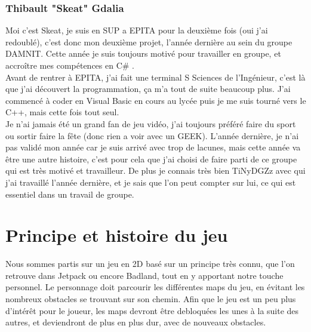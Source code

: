 \documentclass [11pt]{report}
\begin{document}
	
		
		
		\subsection {Thibault "Skeat" Gdalia}

			Moi c'est Skeat, je suis en SUP a EPITA pour la deuxi\`eme fois (oui j'ai redoubl\'e),  c'est donc mon deuxi\`eme projet, l'ann\'ee derni\`ere au sein du groupe DAMNIT. Cette ann\'ee je suis toujours motiv\'e pour travailler en groupe, et accro\^itre mes comp\'etences en C\# . \\
			 \indent  Avant de rentrer à EPITA, j'ai fait une terminal S Sciences de l'Ing\'enieur, c'est là que j'ai découvert la programmation, ça m'a tout de suite beaucoup plus. J'ai commenc\'e à coder en Visual Basic en cours au lyc\'ee puis je me suis tourn\'e vers le C++, mais cette fois tout seul.\\
		 	\indent Je n'ai jamais \'et\'e un grand fan de jeu vid\'eo, j'ai toujours pr\'ef\'er\'e faire du sport ou sortir faire la f\^ete (donc rien a voir avec un GEEK). L'ann\'ee derni\`ere, je n'ai pas valid\'e mon ann\'ee car je suis arriv\'e avec trop de lacunes, mais cette ann\'ee va \^etre une autre histoire, c'est pour cela que j'ai choisi  			de faire parti de ce groupe qui est tr\`es motiv\'e et travailleur. De plus je connais tr\`es bien TiNyDGZz avec qui j'ai travaill\'e l'ann\'ee derni\`ere, et je sais que l'on peut compter sur lui, ce qui est essentiel dans un travail de groupe.\\\vspace{10mm}
	
	

\chapter{Principe et histoire du jeu}

		\indent Nous sommes partis sur un jeu en 2D bas\'e sur un principe tr\`es connu, que l'on retrouve dans Jetpack ou encore Badland, tout en y apportant notre touche personnel. Le personnage doit parcourir les différentes maps du jeu, en évitant les nombreux obstacles se trouvant sur son chemin. Afin que le jeu est un peu plus 		d'intérêt pour le joueur, les maps devront être debloquées les unes à la suite des autres, et deviendront de plus en plus dur, avec de nouveaux obstacles.\\
\end{document}
